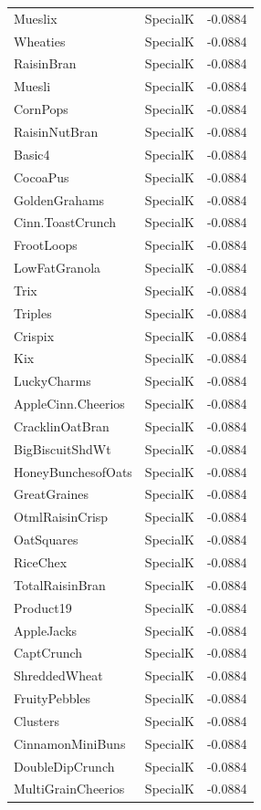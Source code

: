\begin{longtable}{llr}
Mueslix & SpecialK & -0.0884 \\
Wheaties & SpecialK & -0.0884 \\
RaisinBran & SpecialK & -0.0884 \\
Muesli & SpecialK & -0.0884 \\
CornPops & SpecialK & -0.0884 \\
RaisinNutBran & SpecialK & -0.0884 \\
Basic4 & SpecialK & -0.0884 \\
CocoaPus & SpecialK & -0.0884 \\
GoldenGrahams & SpecialK & -0.0884 \\
Cinn.ToastCrunch & SpecialK & -0.0884 \\
FrootLoops & SpecialK & -0.0884 \\
LowFatGranola & SpecialK & -0.0884 \\
Trix & SpecialK & -0.0884 \\
Triples & SpecialK & -0.0884 \\
Crispix & SpecialK & -0.0884 \\
Kix & SpecialK & -0.0884 \\
LuckyCharms & SpecialK & -0.0884 \\
AppleCinn.Cheerios & SpecialK & -0.0884 \\
CracklinOatBran & SpecialK & -0.0884 \\
BigBiscuitShdWt & SpecialK & -0.0884 \\
HoneyBunchesofOats & SpecialK & -0.0884 \\
GreatGraines & SpecialK & -0.0884 \\
OtmlRaisinCrisp & SpecialK & -0.0884 \\
OatSquares & SpecialK & -0.0884 \\
RiceChex & SpecialK & -0.0884 \\
TotalRaisinBran & SpecialK & -0.0884 \\
Product19 & SpecialK & -0.0884 \\
AppleJacks & SpecialK & -0.0884 \\
CaptCrunch & SpecialK & -0.0884 \\
ShreddedWheat & SpecialK & -0.0884 \\
FruityPebbles & SpecialK & -0.0884 \\
Clusters & SpecialK & -0.0884 \\
CinnamonMiniBuns & SpecialK & -0.0884 \\
DoubleDipCrunch & SpecialK & -0.0884 \\
MultiGrainCheerios & SpecialK & -0.0884 \\

\end{longtable}
